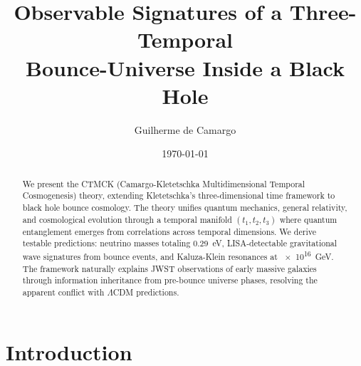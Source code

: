 \documentclass[reprint,amsmath,amssymb,aps,prd,nofootinbib]{revtex4-2}
\begin{document}

\title{Observable Signatures of a Three-Temporal\\ Bounce-Universe Inside a Black Hole}

\author{Guilherme de Camargo}

\date{\today}

\begin{abstract}
We present the CTMCK (Camargo-Kletetschka Multidimensional Temporal Cosmogenesis) theory, extending Kletetschka's three-dimensional time framework to black hole bounce cosmology. The theory unifies quantum mechanics, general relativity, and cosmological evolution through a temporal manifold $(t_1,t_2,t_3)$ where quantum entanglement emerges from correlations across temporal dimensions. We derive testable predictions: neutrino masses totaling \SI{0.29}{\electronvolt}, LISA-detectable gravitational wave signatures from bounce events, and Kaluza-Klein resonances at \SI{e16}{\giga\electronvolt}. The framework naturally explains JWST observations of early massive galaxies through information inheritance from pre-bounce universe phases, resolving the apparent conflict with $\Lambda$CDM predictions.
\end{abstract}

\maketitle


\section{Introduction}\label{sec:intro}
\end{document}
